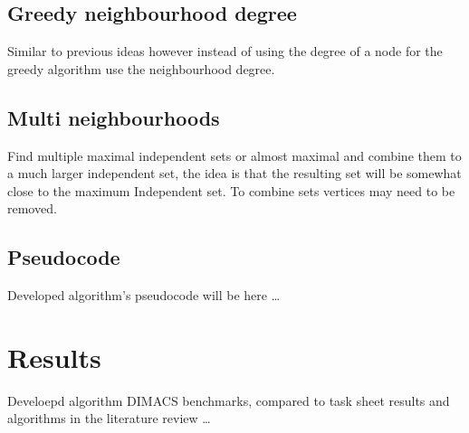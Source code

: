 \documentclass[conference]{IEEEtran}
\begin{document}
\subsection{Greedy neighbourhood degree}
Similar to previous ideas however instead of using the degree of a node for the greedy algorithm use the neighbourhood 
degree.

\subsection{Multi neighbourhoods}
Find multiple maximal independent sets or almost maximal and combine them to a much larger independent set, the idea is 
that the resulting set will be somewhat close to the maximum Independent set. To combine sets vertices may need to be 
removed.

\subsection{Pseudocode}

Developed algorithm's pseudocode will be here \dots

\section{Results}

Develoepd algorithm DIMACS benchmarks, compared to task sheet results and algorithms in the literature review \dots
\end{document}
